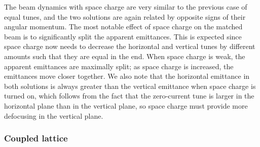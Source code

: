 %
The beam dynamics with space charge are very similar to the previous case of equal tunes, and the two solutions are again related by opposite signs of their angular momentum. The most notable effect of space charge on the matched beam is to significantly split the apparent emittances. This is expected since space charge now needs to decrease the horizontal and vertical tunes by different amounts such that they are equal in the end. When space charge is weak, the apparent emittances are maximally split; as space charge is increased, the emittances move closer together. We also note that the horizontal emittance in both solutions is always greater than the vertical emittance when space charge is turned on, which follows from the fact that the zero-current tune is larger in the horizontal plane than in the vertical plane, so space charge must provide more defocusing in the vertical plane.





\subsubsection{Coupled lattice}

